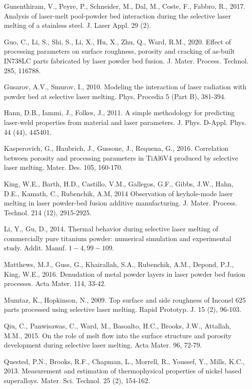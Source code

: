 \documentclass[10pt]{article}
\begin{document}
Gunenthiram, V., Peyre, P., Schneider, M., Dal, M., Coste, F., Fabbro, R., 2017. Analysis of laser-melt pool-powder bed interaction during the selective laser melting of a stainless steel. J. Laser Appl. 29 (2).

Guo, C., Li, S., Shi, S., Li, X., Hu, X., Zhu, Q., Ward, R.M., 2020. Effect of processing parameters on surface roughness, porosity and cracking of as-built IN738LC parts fabricated by laser powder bed fusion. J. Mater. Process. Technol. 285, 116788.

Gusarov, A.V., Smurov, I., 2010. Modeling the interaction of laser radiation with powder bed at selective laser melting. Phys. Procedia 5 (Part B), 381-394.

Hann, D.B., Iammi, J., Folkes, J., 2011. A simple methodology for predicting laser-weld properties from material and laser parameters. J. Phys. D-Appl. Phys. 44 (44), 445401.

Kasperovich, G., Haubrich, J., Gussone, J., Requena, G., 2016. Correlation between porosity and processing parameters in TiAl6V4 produced by selective laser melting. Mater. Des. 105, 160-170.

King, W.E., Barth, H.D., Castillo, V.M., Gallegos, G.F., Gibbs, J.W., Hahn, D.E., Kamath, C., Rubenchik, A.M, 2014 Observation of keyhole-mode laser melting in laser powder-bed fusion additive manufacturing. J. Mater. Process. Technol. 214 (12), 2915-2925.

Li, Y., Gu, D., 2014. Thermal behavior during selective laser melting of commercially pure titanium powder: numerical simulation and experimental study. Addit. Manuf. $1-4,99-109$.

Matthews, M.J., Guss, G., Khairallah, S.A., Rubenchik, A.M., Depond, P.J., King, W.E., 2016. Denudation of metal powder layers in laser powder bed fusion processes. Acta Mater. 114, 33-42.

Mumtaz, K., Hopkinson, N., 2009. Top surface and side roughness of Inconel 625 parts processed using selective laser melting. Rapid Prototyp. J. 15 (2), 96-103.

Qiu, C., Panwisawas, C., Ward, M., Basoalto, H.C., Brooks, J.W., Attallah, M.M., 2015. On the role of melt flow into the surface structure and porosity development during selective laser melting. Acta Mater. 96, 72-79.

Quested, P.N., Brooks, R.F., Chapman, L., Morrell, R., Youssef, Y., Mills, K.C., 2013. Measurement and estimation of thermophysical properties of nickel based superalloys. Mater. Sci. Technol. 25 (2), 154-162.
\end{document}

